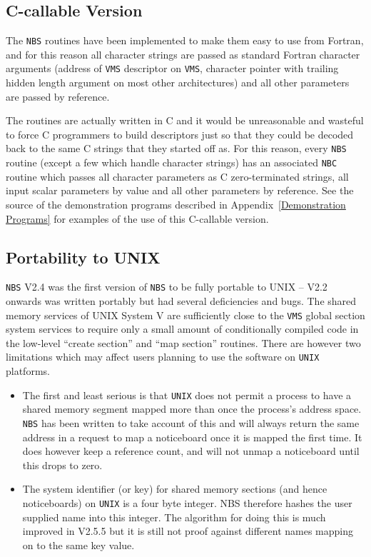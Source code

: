 \documentclass[twoside,11pt,nolof]{starlink}
\begin{document}
      \subsection {C-callable Version} The \texttt{NBS} routines have been %
      implemented to make them easy to use from Fortran, and for this
      reason all character strings are passed as standard Fortran character
      arguments (address of \texttt{VMS} descriptor on \texttt{VMS}, character
      pointer with trailing hidden length argument on most other architectures)
      and all other parameters are passed by reference.

      The routines are actually written in C and it
      would be unreasonable and wasteful to force C programmers to build
      descriptors just so that they could be decoded back to the same C strings
      that they started off as. For this reason, every \texttt{NBS} routine %
(except a few which handle character strings) has an
      associated \texttt{NBC} routine which passes all character parameters %
as C
      zero-terminated strings, all input scalar parameters by value and all
      other parameters by reference. See the source of the demonstration
      programs described in Appendix~\ref {Demonstration Programs} for examples
      of the use of this C-callable version.

      \subsection {Portability to UNIX}
      \texttt{NBS} V2.4 was the first version of \texttt{NBS} to be fully portable
      to UNIX -- V2.2 onwards was written portably but had several
      deficiencies and bugs. The shared memory services of UNIX System V
      are sufficiently close to the \texttt{VMS} global section system
      services to require only a small amount of conditionally compiled code
      in the low-level ``create section'' and ``map section'' routines.
      There are however two limitations which may affect users planning
      to use the software on \texttt{UNIX} platforms.

\begin{itemize}
\item The first and least serious is that \texttt{UNIX} does not permit
a process to have a shared memory segment mapped more than once
the process's address space. \texttt{NBS} has been written to take
account of this and will always return the same address in a request
to map a noticeboard once it is mapped the first time. It does however
keep a reference count, and will not unmap a noticeboard until this
drops to zero.
\item The system identifier (or key) for shared memory sections (and hence
noticeboards) on \texttt{UNIX} is a four byte integer. NBS therefore hashes
the user supplied name into this integer. The algorithm for doing this
is much improved in V2.5.5 but it is still not proof against different
names mapping on to the same key value.
\end{itemize}
\end{document}
